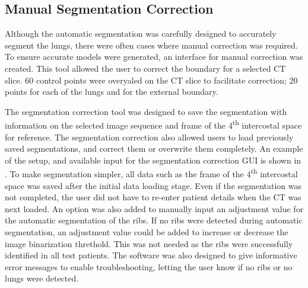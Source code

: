 \subsection{Manual Segmentation Correction}  \label{sec:correct-segment}
Although the automatic segmentation was carefully designed to accurately segment the 
lungs, there were often cases where manual correction was required. To ensure accurate
models were generated, an interface for manual correction was created. 
This tool allowed the user to correct the boundary for a selected CT slice. 
60 control points were overyaled on the CT slice to facilitate correction; 
20 points for each of the lungs and for the external 
boundary.

The segmentation correction tool was designed to save the segmentation with information
on the selected image sequence and frame of the 4\textsuperscript{th} intercostal space 
for reference. 
The segmentation correction also allowed users to load 
previously saved
segmentations, and correct them or overwrite them completely.
An example of the setup, and available input for the segmentation 
correction GUI is shown in .
To make segmentation simpler, all data such as the frame of the 4\textsuperscript{th}
intercostal space was saved after the initial data loading stage. Even if the segmentation 
was not completed, the user did not have to re-enter patient details when the CT was 
next loaded. 
An option was also added to manually input an adjustment value for the automatic
segmentation of the ribs. If no ribs were detected during automatic segmentation,
an adjustment value could be added to increase or decrease the image 
binarization threthold. 
This was not needed as the ribs were successfully identified in all test patients.
The software was also designed to give informative error messages 
to enable troubleshooting, letting the user know if no ribs or no lungs 
were detected. 

